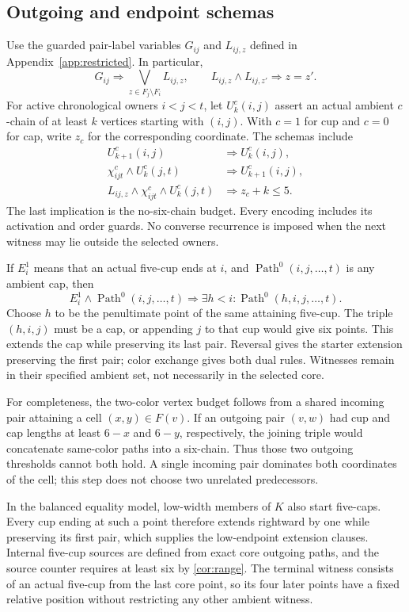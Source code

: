\subsection{Outgoing and endpoint schemas}
Use the guarded pair-label variables $G_{ij}$ and $L_{ij,z}$ defined
in Appendix~\ref{app:restricted}. In particular,
\[
 G_{ij}\Rightarrow\bigvee_{z\in F_j\setminus F_i}L_{ij,z},\qquad
 L_{ij,z}\land L_{ij,z'}\Rightarrow z=z'.
\]
For active chronological owners $i<j<t$, let $U^c_k(i,j)$ assert an
actual ambient $c$-chain of at least $k$ vertices starting with
$(i,j)$. With $c=1$ for cup and $c=0$ for cap, write $z_c$ for the
corresponding coordinate. The schemas include
\begin{align*}
 U^c_{k+1}(i,j)&\Rightarrow U^c_k(i,j),\\
 \chi^c_{ijt}\land U^c_k(j,t)&\Rightarrow U^c_{k+1}(i,j),\\
 L_{ij,z}\land\chi^c_{ijt}\land U^c_k(j,t)&\Rightarrow z_c+k\le5.
\end{align*}
The last implication is the no-six-chain budget. Every encoding
includes its activation and order guards. No converse recurrence is
imposed when the next witness may lie outside the selected owners.

If $E_i^1$ means that an actual five-cup ends at $i$, and
$\operatorname{Path}^0(i,j,\ldots,t)$ is any ambient cap, then
\[
 E_i^1\land\operatorname{Path}^0(i,j,\ldots,t)
 \Rightarrow\exists h<i:\operatorname{Path}^0(h,i,j,\ldots,t).
\]
Choose $h$ to be the penultimate point of the same attaining five-cup.
The triple $(h,i,j)$ must be a cap, or appending $j$ to that cup
would give six points. This extends the cap while preserving its last
pair. Reversal gives the starter extension preserving the first pair;
color exchange gives both dual rules. Witnesses remain in their
specified ambient set, not necessarily in the selected core.

For completeness, the two-color vertex budget follows from a shared
incoming pair attaining a cell $(x,y)\in F(v)$. If an outgoing pair
$(v,w)$ had cup and cap lengths at least $6-x$ and $6-y$, respectively,
the joining triple would concatenate same-color paths into a six-chain.
Thus those two outgoing thresholds cannot both hold. A single incoming
pair dominates both coordinates of the cell; this step does not choose
two unrelated predecessors.

In the balanced equality model, low-width members of $K$ also start
five-caps. Every cup ending at such a point therefore extends rightward
by one while preserving its first pair, which supplies the low-endpoint
extension clauses. Internal five-cup sources are defined from exact core
outgoing paths, and the source counter requires at least six by
\cref{cor:range}. The terminal witness consists of an actual five-cup
from the last core point, so its four later points have a fixed relative
position without restricting any other ambient witness.


